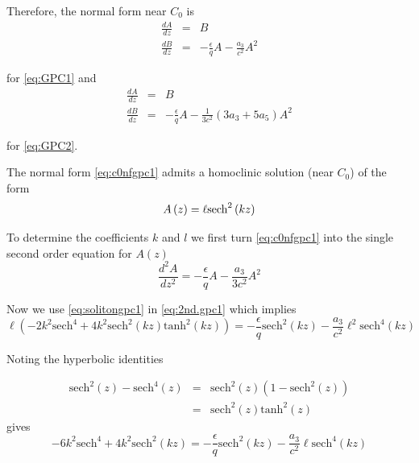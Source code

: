 Therefore, the normal form near $C_0$ is
\begin{subequations}\label{eq:c0nfgpc1}
\begin{eqnarray}
\frac{dA}{dz} &=& B \\
\frac{dB}{dz} &=& -\frac{\epsilon}{q} A - \frac{a_3}{ c^2} A^2
\end{eqnarray}
\end{subequations}

for \eqref{eq:GPC1} and
\begin{subequations}\label{eq:c0nfgpc2}
\begin{eqnarray}
\frac{dA}{dz} &=& B \\
\frac{dB}{dz} &=& -\frac{\epsilon}{q} A - \frac{1}{3 c^2} \left(3 a_3 + 5 a_5 \right) A^2
\end{eqnarray}
\end{subequations}

for \eqref{eq:GPC2}.

The normal form \eqref{eq:c0nfgpc1} admits a homoclinic solution (near $C_0$) of the form 
\begin{equation} \label{eq:solitongpc1}
A\left(z\right) = \ell \space \mathrm{sech}^2\left(k z\right)
\end{equation}

To determine the coefficients $k$ and $l$ we first turn \eqref{eq:c0nfgpc1} into the single
second order equation for $A(z)$
\begin{equation} \label{eq:2nd.gpc1}
\frac{d^2A}{dz^2} = -\frac{\epsilon}{q} A - \frac{a_3}{3 c^2} A^2
\end{equation}

Now we use \eqref{eq:solitongpc1} in \eqref{eq:2nd.gpc1} which implies
\begin{equation}\label{eq:hyperparty1}
\ell \left( -2 k^2 \mathrm{sech}^4 + 4 k^2 \mathrm{sech}^2\left(kz\right) \mathrm{tanh}^2\left(kz\right) \right) = - \frac{\epsilon}{q} \mathrm{sech}^2(kz) - \frac{a_3}{c^2} \ell^2 \mathrm{sech}^4(kz) 
\end{equation}

Noting the hyperbolic identities

\begin{subequations} 
\begin{eqnarray*}
\mathrm{sech}^2\left(z\right) - \mathrm{sech}^4\left(z\right) &=& \mathrm{sech}^2\left(z\right) \left(1 - \mathrm{sech}^2\left(z\right)\right) \\
 &=& \mathrm{sech}^2\left(z\right) \mathrm{tanh}^2\left(z\right)
\end{eqnarray*}
\end{subequations}
gives 
\begin{equation}
-6 k^2 \mathrm{sech}^4 + 4 k^2 \mathrm{sech}^2\left(kz\right)  = - \frac{\epsilon}{q} \mathrm{sech}^2(kz) - \frac{a_3}{c^2} \ell \mathrm{sech}^4(kz) 
\end{equation}

